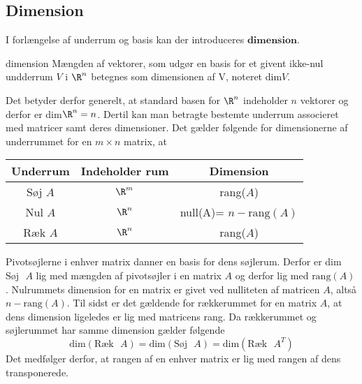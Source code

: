 \subsection{Dimension}
I forlængelse af underrum og basis kan der introduceres 
$\mathbf{dimension}$. 
%
\begin{defn}{}{dimension}
Mængden af vektorer, som udgør en basis for et givent ikke-nul undderrum $V$ i $\R^n$ betegnes som dimensionen af V, noteret dim$V$. 
\end{defn}
\noindent
Det betyder derfor generelt, at standard basen for $\R^n$ indeholder $n$ vektorer og derfor er dim$\R^n = n$. Dertil kan man betragte bestemte underrum associeret med matricer samt deres dimensioner. Det gælder følgende for dimensionerne af underrummet for en $m \times n$ matrix, at \\ 
\begin{center}
 \begin{tabular}{||c c c||} 
 \hline
 Underrum & Indeholder rum & Dimension\\
 \hline\hline
 Søj $A$ & $\R^m$ & rang($A$)\\ 
 \hline
 Nul $A$ & $\R^n$ & null(A)= $n-\text{rang}(A)$\\
 \hline
 Ræk $A$ & $\R^n$ & rang($A$)\\
 \hline
\end{tabular}
\end{center}
\noindent
Pivotsøjlerne i enhver matrix danner en basis for dens søjlerum. Derfor er dim$\text{Søj}\text{  } A$ lig med mængden af pivotsøjler i en matrix $A$ og derfor lig med $\text{rang}(A)$. Nulrummets dimension for en matrix er givet ved nulliteten af matricen $A$, altså $n-\text{rang} (A)$. Til sidst er det gældende for rækkerummet for en matrix $A$, at dens dimension ligeledes er lig med matricens rang. Da rækkerummet og søjlerummet har samme dimension gælder følgende \\
\begin{equation}
\text{dim}(\text{Ræk}\text{  } A)=\text{dim}(\text{Søj}\text{  } A)=\text{dim}(\text{Ræk}\text{  } A^T)
\end{equation}
Det medfølger derfor, at rangen af en enhver matrix er lig med rangen af dens transponerede. 

